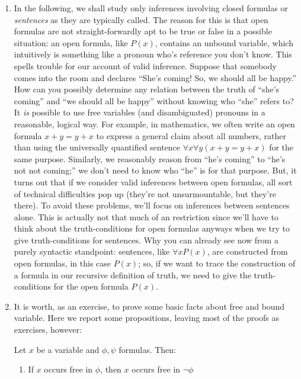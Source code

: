 \begin{enumerate}[\thesection.1]
	  \item In the following, we shall study only inferences involving closed formulas or \emph{sentences} as they are typically called.
		The reason for this is that open formulas are not straight-forwardly apt to be true or false in a possible situation: an open formula, like $P(x)$, contains an unbound variable, which intuitively is something like a pronoun who's reference you don't know.
		This spells trouble for our account of valid inference.
		Suppose that somebody comes into the room and declares ``She's coming! So, we should all be happy.''
		How can you possibly determine any relation between the truth of ``she's coming'' and ``we should all be happy'' without knowing who ``she'' refers to?
		It \emph{is} possible to use free variables (and disambiguated) pronouns in a reasonable, logical way.
		For example, in mathematics, we often write an open formula
		$x+y=y+x$
		to express a general claim about all numbers, rather than using the universally quantified sentence
		$\forall x\forall y(x+y=y+x)$
		for the same purpose.
		Similarly, we reasonably reason from ``he's coming'' to ``he's not not coming;'' we don't need to know who ``he'' is for that purpose.
		But, it turns out that if we consider valid inferences between open formulas, all sort of technical difficulties pop up (they're not unsurmountable, but they're there).
		To avoid these problems, we'll focus on inferences between sentences alone.
		This is actually not that much of an restriction since we'll have to think about the truth-conditions for open formulas anyways when we try to give truth-conditions for sentences.
		Why you can already see now from a purely syntactic standpoint:
		sentences, like
		$\forall xP(x)$,
		are constructed from open formulas,
		in this case $P(x)$;
		so, if we want to trace the construction of a formula in our recursive definition of truth, we need to give the truth-conditions for the open formula
$P(x)$.
		\item It is worth, as an exercise, to prove some basic facts about free and bound variable. Here we report some propositions, leaving most of the proofs as exercises, however:
		
		\begin{proposition}
		Let $x$ be a variable and $\phi,\psi$ formulas. Then:
		\begin{enumerate}[1.]
		
			\item If $x$ occurs free in $\phi$, then $x$ occurs free in $\neg\phi$
			

\end{enumerate}
\end{proposition}
\end{enumerate}
